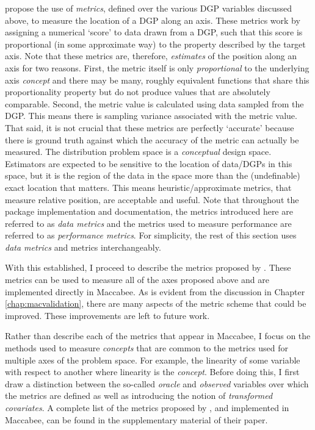 \documentclass[../main.tex]{subfiles}
\begin{document}
\textcite{Dorie2019Automated1} propose the use of \textit{metrics}, defined over the various DGP variables discussed above, to measure the location of a DGP along an axis. These metrics work by assigning a numerical `score' to data drawn from a DGP, such that this score is proportional (in some approximate way) to the property described by the target axis. Note that these metrics are, therefore, \textit{estimates} of the position along an axis for two reasons. First, the metric itself is only \textit{proportional} to the underlying axis \textit{concept} and there may be many, roughly equivalent functions that share this proportionality property but do not produce values that are absolutely comparable. Second, the metric value is calculated using data sampled from the DGP. This means there is sampling variance associated with the metric value. That said, it is not crucial that these metrics are perfectly `accurate' because there is ground truth against which the accuracy of the metric can actually be measured. The distribution problem space is a \textit{conceptual} design space. Estimators are expected to be sensitive to the location of data/DGPs in this space, but it is the region of the data in the space more than the (undefinable) exact location that matters. This means heuristic/approximate metrics, that measure relative position, are acceptable and useful. Note that throughout the package implementation and documentation, the metrics introduced here are referred to as \textit{data metrics} and the metrics used to measure performance are referred to as \textit{performance metrics}. For simplicity, the rest of this section uses \textit{data metrics} and metrics interchangeably.

\vspace{\baselineskip}

With this established, I proceed to describe the metrics proposed by \textcite{Dorie2019Automated1}. These metrics can be used to measure all of the axes proposed above and are implemented directly in Maccabee. As is evident from the discussion in Chapter \ref{chap:macvalidation}, there are many aspects of the metric scheme that could be improved. These improvements are left to future work. 

\vspace{\baselineskip}

Rather than describe each of the metrics that appear in Maccabee, I focus on the methods used to measure \textit{concepts} that are common to the metrics used for multiple axes of the problem space. For example, the linearity of some variable with respect to another where linearity is the \textit{concept}. Before doing this, I first draw a distinction between the so-called \textit{oracle} and \textit{observed} variables over which the metrics are defined as well as introducing the notion of \textit{transformed covariates}. A complete list of the metrics proposed by \textcite{Dorie2019Automated1}, and implemented in Maccabee, can be found in the supplementary material of their paper.
\end{document}
